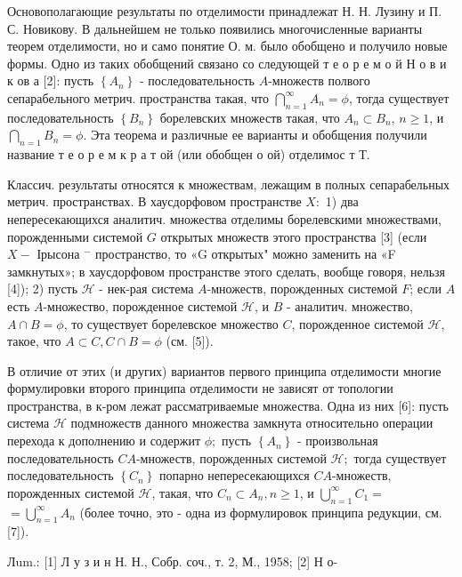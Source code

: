 \documentclass[10pt]{article}
\begin{document}
Основополагающие результаты по отделимости принадлежат Н. Н. Лузину и П. С. Новикову. В дальнейшем не только появились многочисленные варианты теорем отделимости, но и само понятие О. м. было обобщено и получило новые формы. Одно из таких обобщений связано со следующей т е о р е м о й Н о в и к ов а [2]: пусть $\left\{A_{n}\right\}$ - последовательность $A$-множеств полвого сепарабельного метрич. пространства такая, что $\bigcap_{n=1}^{\infty} A_{n}=\phi$, тогда существует последовательность $\left\{B_{n}\right\}$ борелевских множеств такая, что $A_{n} \subset B_{n}$, $n \geqslant 1$, и $\bigcap_{n=1} B_{n}=\phi$. Эта теорема и различные ее варианты и обобщения получили название т е о р е м к р а т ой (или обобщен о ой) отделимос т Т.



Классич. результаты относятся к множествам, лежащим в полных сепарабельных метрич. пространствах. В хаусдорфовом пространстве $X:$ 1) два непересекающихся аналитич. множества отделимы борелевскими множествами, порожденными системой $G$ открытых множеств этого пространства [3] (если $X-$ Ірысона $^{-}$ пространство, то «G открытых" можно заменить на «F замкнутых»; в хаусдорфовом пространстве этого сделать, вообще говоря, нельзя [4]); 2) пусть $\mathscr{H}$ - нек-рая система $A$-множеств, порожденных системой $F$; если $A$ есть $A$-множество, порожденное системой $\mathscr{H}$, и $B$ - аналитич. множество, $A \cap B=\phi$, то существует борелевское множество $C$, порожденное системой $\mathscr{H}$, такое, что $A \subset C, C \cap B=\phi$ (см. [5]).



В отличие от этих (и других) вариантов первого принципа отделимости многие формулировки второго принципа отделимости не зависят от топологии пространства, в к-ром лежат рассматриваемые множества. Одна из них [6]: пусть система $\mathscr{H}$ подмножеств данного множества замкнута относительно операции перехода к дополнению и содержит $\phi ;$ пусть $\left\{A_{n}\right\}$ - произвольная последовательность $C A$-множеств, порожденных системой $\mathscr{H} ;$ тогда существует последовательность $\left\{C_{n}\right\}$ попарно непересекающихся $C A$-множеств, порожденных системой $\mathscr{H}$, такая, что $C_{n} \subset A_{n}, n \geqslant 1$, и $\bigcup_{n=1}^{\infty} C_{1}=$ $=\bigcup_{n=1}^{\infty} A_{n}$ (более точно, это - одна из формулировок принципа редукции, см. [7]).



Лum.: [1] Л у з и н Н. Н., Собр. соч., т. 2, М., 1958; [2] Н о-
\end{document}
